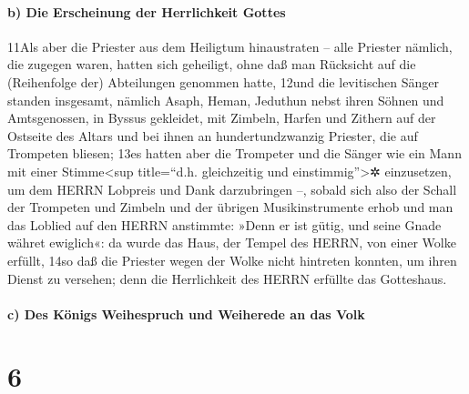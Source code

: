 \hypertarget{b-die-erscheinung-der-herrlichkeit-gottes}{%
\paragraph{b) Die Erscheinung der Herrlichkeit
Gottes}\label{b-die-erscheinung-der-herrlichkeit-gottes}}

11Als aber die Priester aus dem Heiligtum hinaustraten -- alle Priester
nämlich, die zugegen waren, hatten sich geheiligt, ohne daß man
Rücksicht auf die (Reihenfolge der) Abteilungen genommen hatte, 12und
die levitischen Sänger standen insgesamt, nämlich Asaph, Heman, Jeduthun
nebst ihren Söhnen und Amtsgenossen, in Byssus gekleidet, mit Zimbeln,
Harfen und Zithern auf der Ostseite des Altars und bei ihnen an
hundertundzwanzig Priester, die auf Trompeten bliesen; 13es hatten aber
die Trompeter und die Sänger wie ein Mann mit einer Stimme\textless sup
title=``d.h. gleichzeitig und einstimmig''\textgreater✲ einzusetzen, um
dem HERRN Lobpreis und Dank darzubringen --, sobald sich also der Schall
der Trompeten und Zimbeln und der übrigen Musikinstrumente erhob und man
das Loblied auf den HERRN anstimmte: »Denn er ist gütig, und seine Gnade
währet ewiglich«: da wurde das Haus, der Tempel des HERRN, von einer
Wolke erfüllt, 14so daß die Priester wegen der Wolke nicht hintreten
konnten, um ihren Dienst zu versehen; denn die Herrlichkeit des HERRN
erfüllte das Gotteshaus.

\hypertarget{c-des-kuxf6nigs-weihespruch-und-weiherede-an-das-volk}{%
\paragraph{c) Des Königs Weihespruch und Weiherede an das
Volk}\label{c-des-kuxf6nigs-weihespruch-und-weiherede-an-das-volk}}

\hypertarget{section-5}{%
\section{6}\label{section-5}}

